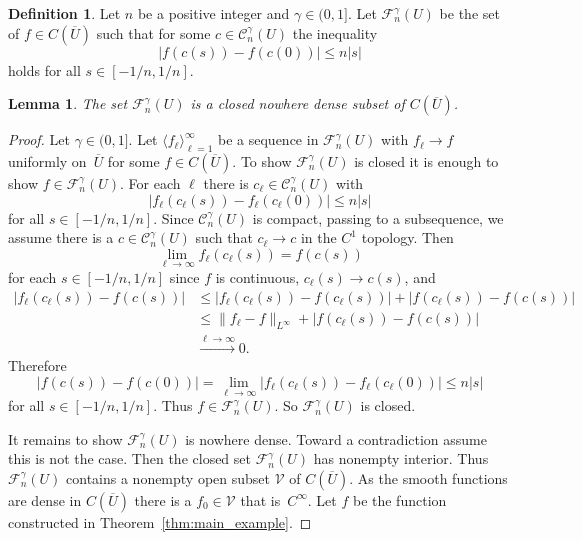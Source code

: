 \documentclass[12pt]{amsart}
\numberwithin{equation}{section}
\newcommand{\la}{\langle}	   	%
\newcommand{\ra}{\rangle}          	%
\newtheorem{lemma}[thm]{Lemma}
\theoremstyle{definition}
\newtheorem{defn}[thm]{Definition}
\theoremstyle{remark}
\begin{document}
\begin{defn}
 Let  $n$ be a positive integer and $\gamma\in (0,1]$.
Let $\mathcal F_n^\gamma (U)$ be the set of $f\in C(\overline U)$ such that 
for some $c \in \mathcal C_n^\gamma (U)$  the  inequality
\begin{equation}\label{eq:F_d-def}
| f(c(s)) - f(c(0)) |\le n |s|
\end{equation}
holds for all $s\in [-1/n,1/n]$.
\end{defn}


\begin{lemma}\label{lem:not_dense}
  The set $\mathcal F_n^\gamma (U)$ is a closed nowhere dense
  subset of $C(\overline U)$.
\end{lemma}


\begin{proof}
Let $\gamma \in (0,1]$. 
Let $\la f_\ell\ra_{\ell =1}^\infty$ be a sequence in $\mathcal F_n^\gamma (U)$
with  $f_\ell \to f$ uniformly  on~$\overline U$
for some   $f\in C(\overline U)$.
To show $\mathcal F_n^\gamma (U)$ is closed it is enough to show
$f\in\mathcal F_n^\gamma (U)$. 
For each $\ell$ there is
 $c_\ell \in \mathcal C_n^\gamma (U)$
with 
$$
| f_\ell(c_\ell(s)) - f_\ell(c_\ell(0))|\le n |s|
$$
for all $s\in [-1/n,1/n]$.
Since  $\mathcal C_n^\gamma (U)$ is compact, 
passing to a subsequence, we  assume there
is a $c\in \mathcal C_n^\gamma (U)$  such that
$c_\ell \to c$ in the $C^1$ topology.
Then
$$
\lim_{\ell \to \infty} f_\ell(c_\ell(s)) = f(c(s))
$$
for each  $s\in [-1/n,1/n]$ since
$f$ is continuous, $c_\ell(s)\to c(s)$, and 
\begin{align*}
  |f_\ell(c_\ell(s))- f(c(s))|&\le |f_\ell(c_\ell(s)) - f(c_\ell(s))| 
        + |f(c_\ell(s)) - f(c(s))|\\
    &\le \| f_\ell - f\|_{L^\infty} + |f(c_\ell(s)) - f(c(s))|\\
    & \stackrel{\ell\to \infty}{\longrightarrow} 0.
\end{align*}
Therefore
$$
|f(c(s)) - f(c(0))| = \lim_{\ell\to \infty} |f_\ell(c_\ell(s))-f_\ell(c_\ell(0))|
\le n |s|
$$
for all $s\in [-1/n,1/n]$.  
Thus $f\in \mathcal F_n^\gamma (U)$.
So  $\mathcal F_n^\gamma (U)$ is closed.


It remains to show $\mathcal F_n^\gamma (U)$ is nowhere dense. 
Toward a contradiction assume this is not the case.
Then the closed set $\mathcal F_n^\gamma (U)$ has nonempty interior. 
Thus $\mathcal F_n^\gamma (U)$ contains 
a nonempty  open subset $\mathcal V$ of $C(\overline U)$.
As  the  smooth functions are dense in $C(\overline U)$
there is a $f_0\in \mathcal V$ that is~$C^\infty$.
Let $f$ be the function constructed in  Theorem~\ref{thm:main_example}.



\end{proof}
\end{document}
